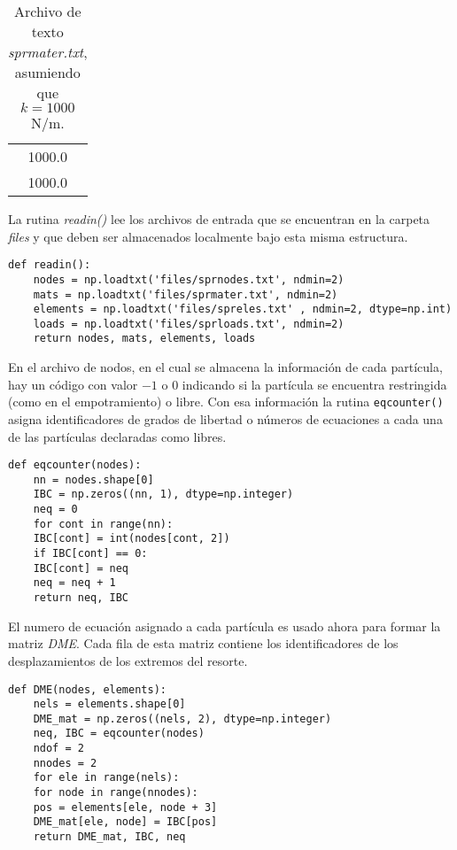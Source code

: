 \begin{table}[H]
    \begin{tabular}{c}
        1000.0 \\
        1000.0
    \end{tabular}
    \caption{Archivo de texto \textit{sprmater.txt}, asumiendo que $k = 
    1000$N/m.}
\end{table}


La rutina \textit{readin()} lee los archivos de entrada que se encuentran en la 
carpeta \textit{files} y que deben ser almacenados localmente bajo esta misma 
estructura.

\begin{verbatim}
def readin():
    nodes = np.loadtxt('files/sprnodes.txt', ndmin=2)
    mats = np.loadtxt('files/sprmater.txt', ndmin=2)
    elements = np.loadtxt('files/spreles.txt' , ndmin=2, dtype=np.int)
    loads = np.loadtxt('files/sprloads.txt', ndmin=2)
    return nodes, mats, elements, loads
\end{verbatim}


En el archivo de nodos, en el cual se almacena la información de cada 
partícula, hay un código con valor $-1$ o $0$ indicando si la partícula se 
encuentra restringida (como en el empotramiento) o libre. Con esa información 
la rutina \texttt{eqcounter()} asigna identificadores de grados de libertad o 
números de ecuaciones a cada una de las partículas declaradas como libres.

\begin{verbatim}
def eqcounter(nodes):
    nn = nodes.shape[0]
    IBC = np.zeros((nn, 1), dtype=np.integer)
    neq = 0
    for cont in range(nn):
    IBC[cont] = int(nodes[cont, 2])
    if IBC[cont] == 0:
    IBC[cont] = neq
    neq = neq + 1
    return neq, IBC
\end{verbatim}

El numero de ecuación asignado a cada partícula es usado ahora para formar la 
matriz \textit{DME}. Cada fila de esta matriz contiene los identificadores de 
los desplazamientos de los extremos del resorte.

\begin{verbatim}
def DME(nodes, elements):
    nels = elements.shape[0]
    DME_mat = np.zeros((nels, 2), dtype=np.integer)
    neq, IBC = eqcounter(nodes)
    ndof = 2
    nnodes = 2
    for ele in range(nels):
    for node in range(nnodes):
    pos = elements[ele, node + 3]
    DME_mat[ele, node] = IBC[pos]
    return DME_mat, IBC, neq
\end{verbatim}

